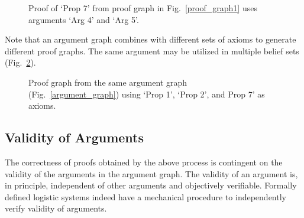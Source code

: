 \documentclass[runningheads]{llncs}
\begin{document}
\begin{figure}[!ht]
\begin{center}
\caption{Proof of `Prop 7' from proof graph in Fig.~\ref{proof_graph1} uses arguments `Arg 4' and `Arg 5'.}
\label{proof_prop7}
\end{center}
\end{figure}

Note that an argument graph combines with different sets of axioms to generate different proof graphs. The same argument may be utilized in multiple belief sets (Fig.~\ref{proof_graph2}).

\begin{figure}[!ht]
\begin{center}
\caption{Proof graph from the same argument graph (Fig.~\ref{argument_graph}) using `Prop 1', `Prop 2', and Prop 7' as axioms.}
\label{proof_graph2}
\end{center}
\end{figure}

\subsection{Validity of Arguments}

The correctness of proofs obtained by the above process is contingent on the validity of the arguments in the argument graph. The validity of an argument is, in principle, independent of other arguments and objectively verifiable. Formally defined logistic systems indeed have a mechanical procedure to independently verify validity of arguments.
\end{document}
